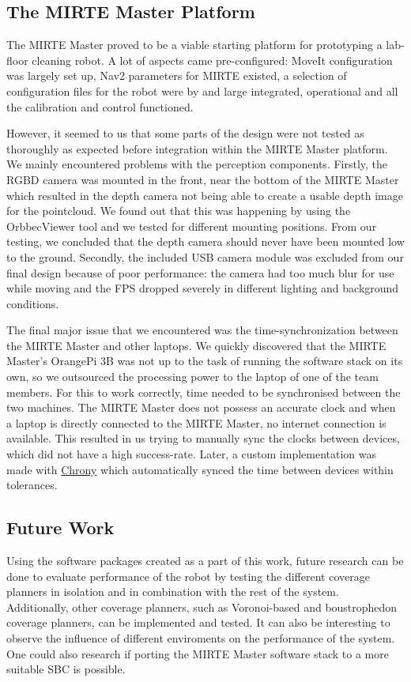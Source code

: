 \subsection{The MIRTE Master Platform}

The MIRTE Master proved to be a viable starting platform for prototyping a lab-floor cleaning robot. A lot of aspects came pre-configured: MoveIt configuration was largely set up, Nav2 parameters for MIRTE existed, a selection of configuration files for the robot were by and large integrated, operational and all the calibration and control functioned.

However, it seemed to us that some parts of the design were not tested as thoroughly as expected before integration within the MIRTE Master platform. We mainly encountered problems with the perception components. Firstly, the RGBD camera was mounted in the front, near the bottom of the MIRTE Master which resulted in the depth camera not being able to create a usable depth image for the pointcloud. We found out that this was happening by using the OrbbecViewer tool and we tested for different mounting positions. From our testing, we concluded that the depth camera should never have been mounted low to the ground. Secondly, the included USB camera module was excluded from our final design because of poor performance: the camera had too much blur for use while moving and the FPS dropped severely in different lighting and background conditions.

The final major issue that we encountered was the time-synchronization between the MIRTE Master and other laptops. We quickly discovered that the MIRTE Master's OrangePi 3B was not up to the task of running the software stack on its own, so we outsourced the processing power to the laptop of one of the team members. For this to work correctly, time needed to be synchronised between the two machines. The MIRTE Master does not possess an accurate clock and when a laptop is directly connected to the MIRTE Master, no internet connection is available. This resulted in us trying to manually sync the clocks between devices, which did not have a high success-rate. Later, a custom implementation was made with \href{https://chrony-project.org/}{Chrony} which automatically synced the time between devices within tolerances.

\subsection{Future Work}

Using the software packages created as a part of this work, future research can be done to evaluate performance of the robot by testing the different coverage planners in isolation and in combination with the rest of the system. Additionally, other coverage planners, such as Voronoi-based \citep{voronoi} and boustrophedon \citep{Choset1997} coverage planners, can be implemented and tested. It can also be interesting to observe the influence of different enviroments on the performance of the system. One could also research if porting the MIRTE Master software stack to a more suitable SBC is possible.